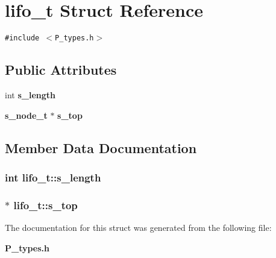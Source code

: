 \section{lifo\_\-t  Struct Reference}
\label{structlifo__t}
{\tt \#include $<$P\_\-types.h$>$}

\subsection*{Public Attributes}
\begin{CompactItemize}
\item 
int {\bf s\_\-length}
\item 
{\bf s\_\-node\_\-t} $\ast$ {\bf s\_\-top}
\end{CompactItemize}


\subsection{Member Data Documentation}
\subsubsection{\setlength{\rightskip}{0pt plus 5cm}int lifo\_\-t::s\_\-length}\label{structlifo__t_m0}


\subsubsection{$\ast$ lifo\_\-t::s\_\-top}\label{structlifo__t_m1}




The documentation for this struct was generated from the following file:\begin{CompactItemize}
\item 
{\bf P\_\-types.h}\end{CompactItemize}
